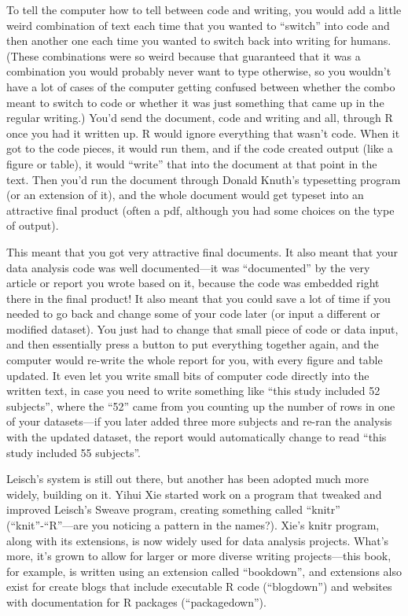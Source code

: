 \documentclass[]{tufte-book}
\begin{document}
To tell the computer how to tell between code and writing, you would add a little
weird combination of text each time that you wanted to ``switch'' into code and then
another one each time you wanted to switch back into writing for humans. (These
combinations were so weird because that guaranteed that it was a combination you
would probably never want to type otherwise, so you wouldn't have a lot of
cases of the computer getting confused between whether the combo meant to switch
to code or whether it was just something that came up in the regular writing.)
You'd send the document, code and writing and all, through R once you had it
written up. R would ignore everything that wasn't code. When it got to the code
pieces, it would run them, and if the code created output (like a figure or table),
it would ``write'' that into the document at that point in the text. Then you'd run
the document through Donald Knuth's typesetting program (or an extension of it),
and the whole document would get typeset into an attractive final product (often
a pdf, although you had some choices on the type of output).

This meant that you got very attractive final documents. It also meant that your
data analysis code was well documented---it was ``documented'' by the very article
or report you wrote based on it, because the code was embedded right there in the
final product! It also meant that you could save a lot of time if you needed to
go back and change some of your code later (or input a different or modified dataset).
You just had to change that small piece of code or data input, and then essentially
press a button to put everything together again, and the computer would re-write the
whole report for you, with every figure and table updated. It even let you write
small bits of computer code directly into the written text, in case you need to
write something like ``this study included 52 subjects'', where the ``52'' came from
you counting up the number of rows in one of your datasets---if you later added three
more subjects and re-ran the analysis with the updated dataset, the report would
automatically change to read ``this study included 55 subjects''.

Leisch's system is still out there, but another has been adopted much more
widely, building on it. Yihui Xie started work on a program that tweaked and
improved Leisch's Sweave program, creating something called ``knitr''
(``knit''-``R''---are you noticing a pattern in the names?). Xie's knitr program,
along with its extensions, is now widely used for data analysis projects. What's
more, it's grown to allow for larger or more diverse writing projects---this
book, for example, is written using an extension called ``bookdown'', and
extensions also exist for create blogs that include executable R code
(``blogdown'') and websites with documentation for R packages (``packagedown'').
\end{document}
